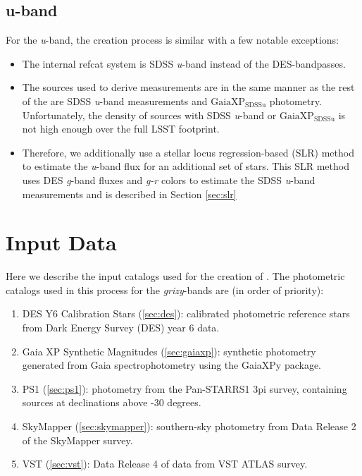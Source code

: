 \subsection{u-band}
For the \textit{u}-band, the creation process is similar with a few notable exceptions:
\begin{itemize}
    \item The internal refcat system is SDSS \textit{u}-band instead of the DES-bandpasses.
    \item The sources used to derive measurements are in the same manner as the rest of the \monster are SDSS \textit{u}-band measurements and $\mathrm{GaiaXP_{SDSSu}}$ photometry. 
    Unfortunately, the density of sources with SDSS \textit{u}-band or $\mathrm{GaiaXP_{SDSSu}}$ is not high enough over the full LSST footprint. 
    \item 
    Therefore, we additionally use a stellar locus regression-based (SLR) method to estimate the \textit{u}-band flux for an additional set of stars. 
    This SLR method uses DES \textit{g}-band fluxes and \textit{g-r} colors to estimate the SDSS \textit{u}-band measurements and is described in Section \ref{sec:slr}
\end{itemize}



\section{Input Data}
\label{sec:input}
Here we describe the input catalogs used for the creation of \monster. 
The photometric catalogs used in this process for the \emph{grizy}-bands are (in order of priority):
\begin{enumerate}
    \item DES Y6 Calibration Stars (\ref{sec:des}): calibrated photometric reference stars from Dark Energy Survey (DES) year 6 data.
    \item Gaia XP Synthetic Magnitudes (\ref{sec:gaiaxp}): synthetic photometry generated from Gaia spectrophotometry using the GaiaXPy package.
    \item PS1 (\ref{sec:ps1}): photometry from the Pan-STARRS1 3pi survey, containing sources at declinations above -30 degrees.
    \item SkyMapper (\ref{sec:skymapper}): southern-sky photometry from Data Release 2 of the SkyMapper survey.
    \item VST (\ref{sec:vst}): Data Release 4 of data from VST ATLAS survey.
\end{enumerate}

